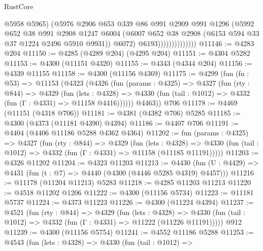 \begin{lexlean}{RustCore}
\begin{coremodule}
                                @5958
                                @5965)
                              (@5976
                                @2906
                                @653
                                @339
                                @86
                                @991
                                @2909
                                @991
                                @1296
                                (@5992
                                  @652
                                  @38
                                  @991
                                  @2908
                                  @1247
                                  @6004
                                  (@6007
                                    @652
                                    @38
                                    @2908
                                    (@6153 @594 @33 @37 @1224 @2496 @5910 @9931))
                                  @6072)
                                @6193))))))))))))))
@11146 := @4283 @204
@11150 := @4285 (@4289 @204) (@4295 @204)
@11151 := @4304 @5282
@11153 := @4300 (@11151 @4320)
@11155 := @4343 (@4344 @204)
@11156 := @4339 @11155
@11158 := @4300 (@11156 @4369)
@11175 := @4299
    (fun (fn : @53) =>
    @11153
      (@4323
        (@4326
          (fun (params : @4325) =>
          @4327
            (fun (rty : @844) =>
            @4329
              (fun (lets : @4328) =>
              @4330 (fun (tail : @1012) => @4332 (fun (Γ : @4331) => @11158 @4416))))))
        @4463))
    @706
@11178 := @4469 (@11151 (@4318 @706))
@11181 := @4381 (@4382 @706) @5285
@11185 := @4300 (@4373 (@11181 @4390) @4394)
@11186 := @4407 @706
@11191 := @4404 (@4406 @11186 @5288 @4362 @4364)
@11202 := fun (params : @4325) =>
  @4327
    (fun (rty : @844) =>
    @4329
      (fun (lets : @4328) =>
      @4330 (fun (tail : @1012) => @4332 (fun (Γ : @4331) => @11158 (@11185 @11191)))))
@11203 := @4326 @11202
@11204 := @4323 @11203
@11213 := @4430 (fun (U : @4429) => @4431 (fun (t : @7) => @4440 (@4300 (@4446 @5285 @4319) @4457)))
@11216 := @11178 (@11204 @11213) @5283
@11218 := @4285 @11203 @11213
@11220 := @4518 @11202 @1206
@11222 := @4300 (@11156 @5734)
@11223 := @11181 @5737
@11224 := @4373 @11223
@11226 := @4300 (@11224 @4394)
@11237 := @4521
    (fun (rty : @844) =>
    @4329
      (fun (lets : @4328) =>
      @4330 (fun (tail : @1012) => @4332 (fun (Γ : @4331) => @11222 (@11226 @11191)))))
    @912
@11239 := @4300 (@11156 @5754)
@11241 := @4552 @11186 @5288
@11253 := @4543
    (fun (lets : @4328) =>
    @4330
      (fun (tail : @1012) =>

\end{coremodule}
\end{lexlean}
